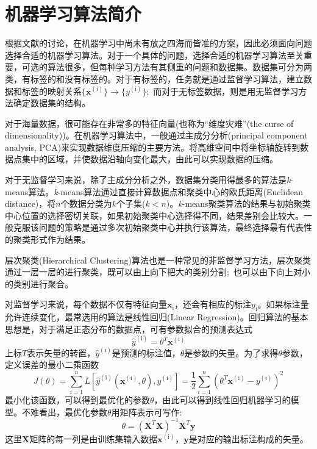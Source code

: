 \documentclass[10pt, oneside, a4paper]{article}      %
\newcommand{\upcite}[1]{\hspace{0ex}\textsuperscript{\cite{#1}}} %
\begin{document}
\section{机器学习算法简介}
根据文献\cite{IEEE-TEC1-67_1997,NC8-1341_1996}的讨论，在机器学习中尚未有放之四海而皆准的方案，因此必须面向问题选择合适的机器学习算法。对于一个具体的问题，选择合适的机器学习算法至关重要，可选的算法很多，但每种学习方法有其侧重的问题和数据集。数据集可分为两类，有标签的和没有标签的。对于有标签的，任务就是通过监督学习算法，建立数据和标签的映射关系$\{\mathbf{x}^{(\mathrm{i})}\}\rightarrow\{y^{(\mathrm{i})}\}$;~而对于无标签数据，则是用无监督学习方法确定数据集的结构。

对于海量数据，很可能存在非常多的特征向量(也称为“维度灾难”\textrm{(the curse of dimensionality)})。在机器学习算法中，一般通过主成分分析(\textrm{principal component analysis, PCA})来实现数据维度压缩的主要方法\upcite{OJS6-701_2016}。将高维空间中将坐标轴旋转到数据点集中的区域，并使数据沿轴向变化最大，由此可以实现数据的压缩。

对于无监督学习来说，除了主成分分析之外，数据集分类用得最多的算法是\textit{k}-\textrm{means}算法\upcite{EJHPS4-2_2008}。\textit{k}-\textrm{means}算法通过直接计算数据点和聚类中心的欧氏距离\textrm{(Euclidean distance)}，将$n$个数据分类为$k$个子集($k<n$)。\textit{k}-\textrm{means}聚类算法的结果与初始聚类中心位置的选择密切关联，如果初始聚类中心选择得不同，结果差别会比较大。一般克服该问题的策略是通过多次初始聚类中心并执行该算法，最终选择最有代表性的聚类形式作为结果。

层次聚类(\textrm{Hierarchical Clustering})算法也是一种常见的非监督学习方法，层次聚类通过一层一层的进行聚类，既可以由上向下把大的类别分割;~也可以由下向上对小的类别进行聚合。

对监督学习来说，每个数据不仅有特征向量$\mathbf{x}_{\mathrm{i}}$，还会有相应的标注$y_{\mathrm{i}}$。如果标注量允许连续变化，最常选用的算法是线性回归\textrm{(Linear Regression)}。回归算法的基本思想是，对于满足正态分布的数据点，可有参数拟合的预测表达式
\begin{equation}
	\hat y^{(\mathrm{i})}=\theta^T\mathbf{x}^{(\mathrm{i})}
	\label{eq:linear_eq}
\end{equation}
上标$T$表示矢量的转置，$\hat y^{(\mathrm{i})}$是预测的标注值，$\theta$是参数的矢量。为了求得$\theta$参数，定义误差的最小二乘函数
\begin{equation}
	J(\theta)=\sum_{i=1}^nL[\hat{y}^{(\mathrm{i})}(\mathbf{x}^{(\mathrm{i})},\theta),y^{(\mathrm{i})}]=\dfrac12\sum_{i=1}^n(\theta^T\mathbf{x}^{(\mathrm{i})}-y^{(\mathrm{i})})^2
	\label{eq:linear_2}
\end{equation}
最小化该函数，可以得到最优化的参数$\theta$，由此可以得到线性回归机器学习的模型。不难看出，最优化参数$\theta$用矩阵表示可写作:~
\begin{displaymath}
	\theta=(\mathbf{X}^T\mathbf{X})^{-1}\mathbf{X}^T\mathbf{y}
\end{displaymath}
这里$\mathbf{X}$矩阵的每一列是由训练集输入数据$\mathbf{x}^{(\mathrm{i})}$，$\mathbf{y}$是对应的输出标注构成的矢量。
\end{document}
